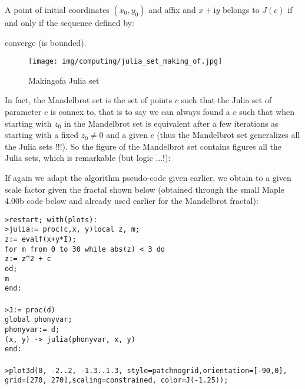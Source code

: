 	A point of initial coordinates $(x_0, y_0)$ and affix and $x + \mathrm{i}y$ belongs to $J(c)$ if and only if the sequence defined by:
	
	converge (is bounded).
	\begin{figure}[H]
		\centering
		\texttt{[image: img/computing/julia\_set\_making\_of.jpg]}
		\caption{Makingofa Julia set}
	\end{figure}
	In fact, the Mandelbrot set is the set of points $c$ such that the Julia set of parameter $c$ is connex to, that is to say we can always found a $c$ such that when starting with $z_0$ in the Mandelbrot set is equivalent after a few iterations as starting with a fixed $z_0\neq 0$ and a given $c$ (thus the Mandelbrot set generalizes all the Julia sets !!!). So the figure of the Mandelbrot set contains figures all the Julia sets, which is remarkable (but logic ...!):
	
	If again we adapt the algorithm pseudo-code given earlier, we obtain to a given scale factor given the fractal shown below (obtained through the small Maple 4.00b code below and already used earlier for the Mandelbrot fractal):
	
	\texttt{>restart; with(plots):\\
	>julia:= proc(c,x, y)local z, m;\\
	z:= evalf(x+y*I);\\
	for m from 0 to 30 while abs(z) < 3 do\\
	   z:= z\string^2 + c\\
	   od;\\
	   m\\
	end:\\\\
	>J:= proc(d)\\
	global phonyvar;\\
	phonyvar:= d;\\
	(x, y) -> julia(phonyvar, x, y)\\
	end:\\\\
	>plot3d(0, -2..2, -1.3..1.3, style=patchnogrid,orientation=[-90,0], grid=[270, 270],scaling=constrained, color=J(-1.25));\\}
	
